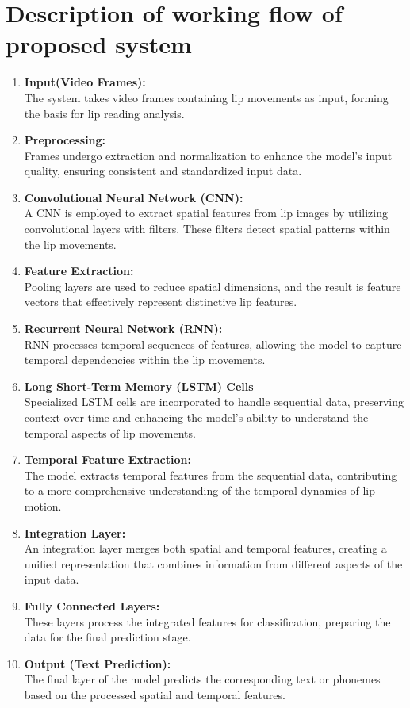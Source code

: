 	
	

\section{Description of working flow of proposed system}
\begin{enumerate}
	\item \textbf{Input(Video Frames):}
	\\ The system takes video frames containing lip movements as input, forming the basis for lip reading analysis.
	\item \textbf{Preprocessing:}
	\\Frames undergo extraction and normalization to enhance the model's input quality, ensuring consistent and standardized input data.
	\item \textbf{Convolutional Neural Network (CNN):}
	\\A CNN is employed to extract spatial features from lip images by utilizing convolutional layers with filters. These filters detect spatial patterns within the lip movements.
	\item \textbf{Feature Extraction:}
	\\Pooling layers are used to reduce spatial dimensions, and the result is feature vectors that effectively represent distinctive lip features.
	\item \textbf{Recurrent Neural Network (RNN):}
	\\RNN processes temporal sequences of features, allowing the model to capture temporal dependencies within the lip movements.
	\item \textbf{Long Short-Term Memory (LSTM) Cells}
	\\Specialized LSTM cells are incorporated to handle sequential data, preserving context over time and enhancing the model's ability to understand the temporal aspects of lip movements.
	\item \textbf{Temporal Feature Extraction:}
	\\The model extracts temporal features from the sequential data, contributing to a more comprehensive understanding of the temporal dynamics of lip motion.
	\item \textbf{Integration Layer:}
	\\An integration layer merges both spatial and temporal features, creating a unified representation that combines information from different aspects of the input data.
	\item \textbf{Fully Connected Layers:}
	\\These layers process the integrated features for classification, preparing the data for the final prediction stage.
	\item \textbf{Output (Text Prediction):}
	\\The final layer of the model predicts the corresponding text or phonemes based on the processed spatial and temporal features.
\end{enumerate}